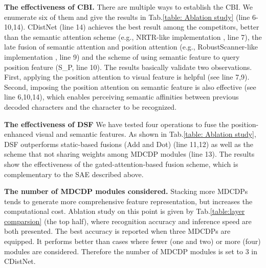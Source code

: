 \noindent\textbf{The effectiveness of CBI.}
There are multiple ways to establish the CBI. We enumerate six of them and give the results in Tab.\ref{table: Ablation study} (line 6-10,14). CDistNet (line 14) achieves the best result among the competitors, better than the semantic attention scheme (e.g., NRTR-like implementation \citep{sheng2019nrtr}, line 7), the late fusion of semantic attention and position attention (e.g., RobustScanner-like implementation \citep{yue2020robustscanner}, line 9) and the scheme of using semantic feature to query position feature (S\_P, line 10). The results basically validate two observations. First, applying the position attention to visual feature is helpful (see line 7,9). Second, imposing the position attention on semantic feature is also effective (see line 6,10,14), which enables perceiving semantic affinities between previous decoded characters and the character to be recognized.

\noindent\textbf{The effectiveness of DSF}
We have tested four operations to fuse the position-enhanced visual and semantic features. As shown in Tab.\ref{table: Ablation study}, DSF outperforms static-based fusions (Add and Dot) (line 11,12) as well as the scheme that not sharing weights among MDCDP modules (line 13). The results show the effectiveness of the gated-attention-based fusion scheme, which is complementary to the SAE described above.


\noindent\textbf{The number of MDCDP modules considered.}
Stacking more MDCDPs tends to generate more comprehensive feature representation, but increases the computational cost. Ablation study on this point is given by Tab.\ref{table:layer comparsion} (the top half), where recognition accuracy and inference speed are both presented. The best accuracy is reported when three MDCDPs are equipped. It performs better than cases where fewer (one and two) or more (four) modules are considered. Therefore the number of MDCDP modules is set to 3 in CDistNet.


